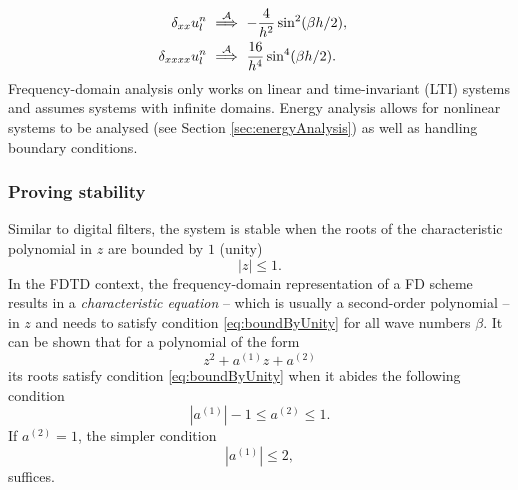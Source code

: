 {{\begin{subequations}
\begin{align}
    \delta_{xx}u_l^n&\ \overset{\mathcal{A}}{\Longrightarrow}\  -\frac{4}{h^2} \sin^2(\beta h / 2), \quad \label{eq:dxxAnsatz}\\
    \delta_{xxxx} u_l^n&\ \overset{\mathcal{A}}{\Longrightarrow}\ \frac{16}{h^4} \sin^4(\beta h / 2).\label{eq:dxxxxAnsatz}
\end{align}
\end{subequations}
Frequency-domain analysis only works on linear and time-invariant (LTI) systems and assumes systems with infinite domains. Energy analysis allows for nonlinear  systems to be analysed (see Section \ref{sec:energyAnalysis}) as well as handling boundary conditions.   

\subsubsection{Proving stability}
Similar to digital filters, the system is stable when the roots of the characteristic polynomial in $z$ are bounded by $1$ (unity)
\begin{equation}\label{eq:boundByUnity}
    |z| \leq 1.
\end{equation} 
In the FDTD context, the frequency-domain representation of a FD scheme results in a \textit{characteristic equation} -- which is usually a second-order polynomial -- in $z$ and needs to satisfy condition \eqref{eq:boundByUnity} for all wave numbers $\beta$.
It can be shown that for a polynomial of the form 
\begin{equation}\label{eq:polynomialForm}
    z^2 + a^{(1)}z + a^{(2)}
\end{equation} 
its roots satisfy condition \eqref{eq:boundByUnity} when it abides the following condition \cite{theBible}
\begin{equation}\label{eq:condition214}
    |a^{(1)}| - 1 \leq a^{(2)} \leq 1.
\end{equation}
If $a^{(2)} = 1$, the simpler condition
\begin{equation}\label{eq:simplerCondition215}
    |a^{(1)}|\leq 2,
\end{equation}
suffices. 

}}
